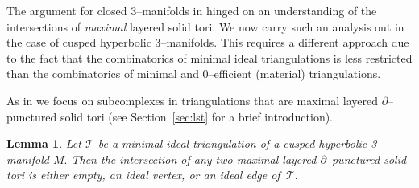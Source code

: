 \documentclass[a4paper]{gtart}
\def\tri{\mathcal{T}}
\def\manifold{M}
\theoremstyle{plain}
\newtheorem{lemma}[theorem]{Lemma}
\theoremstyle{definition}
\theoremstyle{remark}
\numberwithin{equation}{section}
\begin{document}
The argument for closed 3--manifolds in \cite{Jaco-Z2-2013} hinged on an understanding of the intersections of \emph{maximal} layered solid tori. We now carry such an analysis out in the case of cusped hyperbolic 3--manifolds. This requires a different approach due to the fact that the combinatorics of minimal ideal triangulations is less restricted than the combinatorics of minimal and 0--efficient (material) triangulations.
 
As in \cite{Jaco-Z2-2013} we focus on subcomplexes in triangulations that are maximal layered $\partial$--punctured solid tori (see Section~\ref{sec:lst} for a brief introduction).

\begin{lemma}
  \label{lem:intersection}
  Let $\tri$ be a minimal ideal triangulation of a cusped hyperbolic 3--manifold $\manifold.$ Then 
  the intersection of any two maximal layered $\partial$--punctured solid tori is either empty, an ideal vertex, or an ideal edge of~$\tri.$   
\end{lemma}
\end{document}

